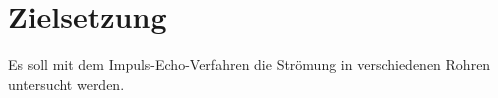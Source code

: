 
\section{Zielsetzung}
\label{sec:Zielsetzung}
Es soll mit dem Impuls-Echo-Verfahren die Strömung in verschiedenen Rohren untersucht werden.
